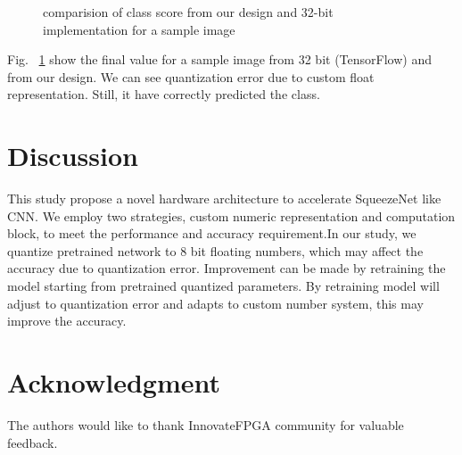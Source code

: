 \documentclass[conference]{IEEEtran}
\begin{document}
\begin{figure} 
   \centering
   \label{1b}
 \caption{comparision of class score from our design and 32-bit implementation for a sample image}
 \label{fig1} 
\end{figure}


Fig. ~\ref{fig1} show the final value for a sample image from 32 bit (TensorFlow) and from our design. We can see quantization error due to custom float representation. Still, it have correctly predicted the class. 



\section{Discussion}
This study propose a novel hardware architecture to accelerate SqueezeNet like CNN. We employ two strategies, custom numeric representation and computation block, to meet the performance and accuracy requirement.In our study, we quantize pretrained network to 8 bit floating numbers, which may affect the accuracy due to quantization error. Improvement can be made by retraining the model starting from pretrained quantized parameters. By retraining model will adjust to quantization error and adapts to custom number system, this may improve the accuracy.

\section*{Acknowledgment}
The authors would like to thank InnovateFPGA community for valuable feedback.



\end{document}
